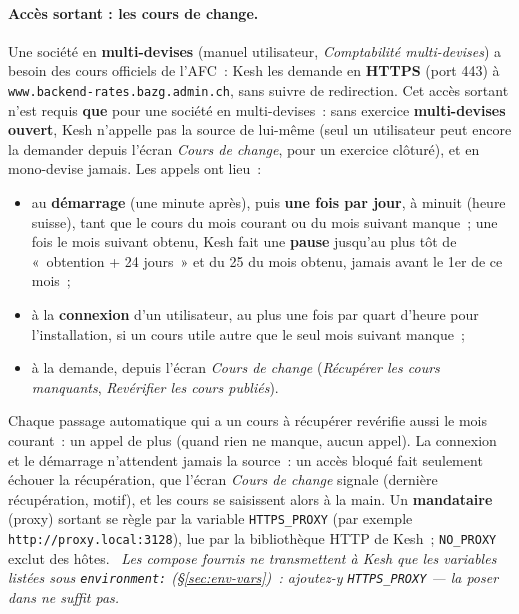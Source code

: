 \documentclass[a4paper,11pt,oneside]{article}
\begin{document}
\begin{sloppypar}
\paragraph{Accès sortant : les cours de change.}\label{sec:acces-sortant-cours} Une société en \textbf{multi-devises} (manuel utilisateur, \emph{Comptabilité multi-devises}) a besoin des cours officiels de l'AFC~: Kesh les demande en \textbf{HTTPS} (port 443) à \texttt{www.backend-rates.bazg.admin.ch}, sans suivre de redirection. Cet accès sortant n'est requis \textbf{que} pour une société en multi-devises~: sans exercice \textbf{multi-devises ouvert}, Kesh n'appelle pas la source de lui-même (seul un utilisateur peut encore la demander depuis l'écran \emph{Cours de change}, pour un exercice clôturé), et en mono-devise jamais. Les appels ont lieu~:
\begin{itemize}
    \item au \textbf{démarrage} (une minute après), puis \textbf{une fois par jour}, à minuit (heure suisse), tant que le cours du mois courant ou du mois suivant manque~; une fois le mois suivant obtenu, Kesh fait une \textbf{pause} jusqu'au plus tôt de «~obtention + 24 jours~» et du 25 du mois obtenu, jamais avant le 1er de ce mois~;
    \item à la \textbf{connexion} d'un utilisateur, au plus une fois par quart d'heure pour l'installation, si un cours utile autre que le seul mois suivant manque~;
    \item à la demande, depuis l'écran \emph{Cours de change} (\emph{Récupérer les cours manquants}, \emph{Revérifier les cours publiés}).
\end{itemize}
Chaque passage automatique qui a un cours à récupérer revérifie aussi le mois courant~: un appel de plus (quand rien ne manque, aucun appel). La connexion et le démarrage n'attendent jamais la source~: un accès bloqué fait seulement échouer la récupération, que l'écran \emph{Cours de change} signale (dernière récupération, motif), et les cours se saisissent alors à la main. Un \textbf{mandataire} (proxy) sortant se règle par la variable \texttt{HTTPS\_PROXY} (par exemple \texttt{http://proxy.local:3128}), lue par la bibliothèque HTTP de Kesh~; \texttt{NO\_PROXY} exclut des hôtes. \keshAttention\ \emph{Les compose fournis ne transmettent à Kesh que les variables listées sous \texttt{environment:} (\S\ref{sec:env-vars})~: ajoutez-y \texttt{HTTPS\_PROXY} --- la poser dans  ne suffit pas.}
\end{sloppypar}
\end{document}
